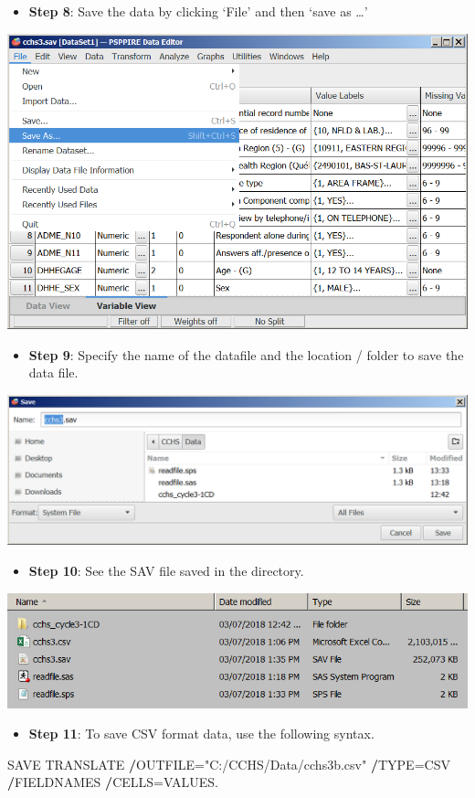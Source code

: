 \documentclass[
]{book}
\newenvironment{Shaded}{\begin{snugshade}}{\end{snugshade}}
\newcommand{\NormalTok}[1]{#1}
\newcommand{\OperatorTok}[1]{\textcolor[rgb]{0.81,0.36,0.00}{\textbf{#1}}}
\newcommand{\StringTok}[1]{\textcolor[rgb]{0.31,0.60,0.02}{#1}}
\providecommand{\tightlist}{%
  \setlength{\itemsep}{0pt}\setlength{\parskip}{0pt}}
\begin{document}
\begin{itemize}
\tightlist
\item
  \textbf{Step 8}: Save the data by clicking `File' and then `save as \ldots{}'
\end{itemize}

\includegraphics[width=0.65\linewidth]{images/abacus38}

\begin{itemize}
\tightlist
\item
  \textbf{Step 9}: Specify the name of the datafile and the location / folder to save the data file.
\end{itemize}

\includegraphics[width=0.65\linewidth]{images/abacus39}

\begin{itemize}
\tightlist
\item
  \textbf{Step 10}: See the SAV file saved in the directory.
\end{itemize}

\includegraphics[width=0.65\linewidth]{images/abacus40}

\begin{itemize}
\tightlist
\item
  \textbf{Step 11}: To save CSV format data, use the following syntax.
\end{itemize}

\begin{Shaded}
\begin{Highlighting}[]
\NormalTok{SAVE TRANSLATE}
  \OperatorTok{/}\NormalTok{OUTFILE=}\StringTok{"C:/CCHS/Data/cchs3b.csv"}  
  \OperatorTok{/}\NormalTok{TYPE=CSV}
  \OperatorTok{/}\NormalTok{FIELDNAMES      }
  \OperatorTok{/}\NormalTok{CELLS=VALUES.}
\end{Highlighting}
\end{Shaded}
\end{document}

